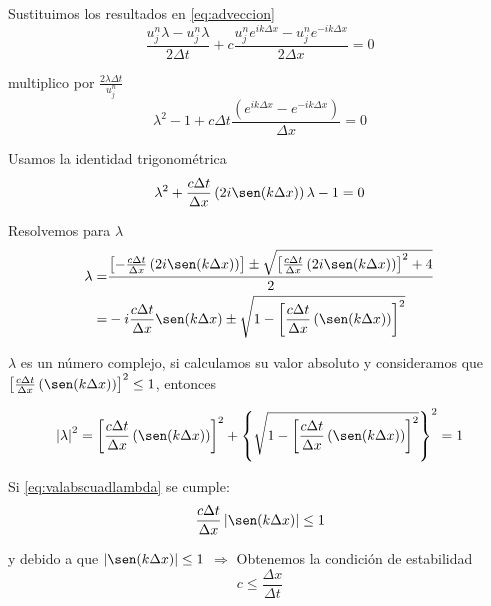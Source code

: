 \documentclass{article}
\begin{document}
Sustituimos los resultados en \autoref{eq:adveccion}
\begin{equation}
	\frac{u_j^{n}\lambda-u_j^{n}\lambda}{2\Delta t} + c \frac{u_{j}^{n}e^{ik \Delta x}-u_{j}^{n}e^{-ik \Delta x}}{2\Delta x} = 0
\end{equation}

multiplico por $\frac{2\lambda \Delta t}{u_j^n}$
\begin{equation}
	\lambda^2 -1 + c \Delta t \frac{\left( e^{ik \Delta x} - e^{-ik \Delta x} \right)}{\Delta x}= 0
\end{equation}

Usamos la identidad trigonométrica
\begin{equation}
	\lambda^2 + \frac{c\Delta t}{\Delta x} \left( 2i \sen(k\Delta x) \right)\lambda -1 = 0
\end{equation}

Resolvemos para $\lambda$
\begin{equation}
\begin{split}
	\lambda = & \frac{ \left[ -\frac{c\Delta t}{\Delta x}\left( 2i \sen(k\Delta x) \right) \right]  \pm \sqrt{ \left[ \frac{c\Delta t}{\Delta x}\left( 2i \sen(k\Delta x) \right) \right]^2 + 4}}{2}\\
	= & -i\frac{c\Delta t}{\Delta x} \sen(k\Delta x) \pm \sqrt{ 1 - \left[ \frac{c\Delta t}{\Delta x}\left( \sen(k\Delta x) \right) \right]^2}
\end{split}
\end{equation}

$\lambda$ es un número complejo, si calculamos su valor absoluto y consideramos que $\left[ \frac{c\Delta t}{\Delta x}\left( \sen(k\Delta x) \right) \right]^2 \leq 1$, entonces

\begin{equation}
	\left| \lambda \right|^2 =  \left[ \frac{c\Delta t}{\Delta x}\left( \sen(k\Delta x) \right) \right]^2 + 
	\left\{ \sqrt{ 1-  \left[ \frac{c\Delta t}{\Delta x}\left( \sen(k\Delta x) \right) \right]^2 } \right\}^2 = 1
	\label{eq:valabscuadlambda}
\end{equation}

Si \autoref{eq:valabscuadlambda} se cumple:
\begin{equation}
	\frac{c\Delta t}{\Delta x}\left| \sen(k\Delta x) \right| \leq 1
\end{equation}

y debido a que $| \sen(k\Delta x)| \leq 1$ $\Rightarrow$ Obtenemos la condición de estabilidad
\begin{equation}
	c \leq \frac{\Delta x}{\Delta t}
\end{equation}
\end{document}
